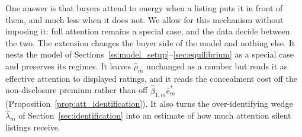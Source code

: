 One answer is that buyers attend to energy when a listing puts it in front of them, and much less when it does not. We allow for this mechanism without imposing it: full attention remains a special case, and the data decide between the two. The extension changes the buyer side of the model and nothing else. It nests the model of Sections~\ref{ss:model_setup}--\ref{sec:equilibrium} as a special case and preserves its regimes. It leaves $\hat\rho_m$ unchanged as a number but reads it as effective attention to displayed ratings, and it reads the concealment cost off the non-disclosure premium rather than off $\hat\beta_{1,m}\hat e^*_m$ (Proposition~\ref{prop:att_identification}). It also turns the over-identifying wedge $\hat\lambda_m$ of Section~\ref{sec:identification} into an estimate of how much attention silent listings receive.
